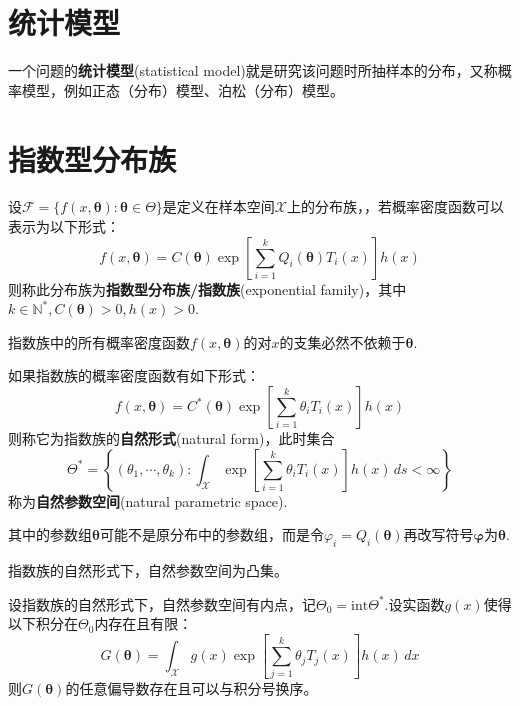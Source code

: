 \documentclass{ctexbook}
\begin{document}
\section{统计模型}

一个问题的\textbf{统计模型}(statistical model)就是研究该问题时所抽样本的分布，又称概率模型，例如正态（分布）模型、泊松（分布）模型。

\section{指数型分布族}

\begin{definition}
    设$\mathcal{F}=\{f(x,\boldsymbol{\theta}):\boldsymbol{\theta}\in\Theta\}$是定义在样本空间$\mathcal{X} $上的分布族，，若概率密度函数可以表示为以下形式：
    $$f(x,\boldsymbol{\theta})=C(\boldsymbol{\theta})\exp\left[\sum_{i=1}^k Q_i(\boldsymbol{\theta})T_i(x)\right]h(x)$$
    则称此分布族为\textbf{指数型分布族/指数族}(exponential family)，其中$k\in\mathbb{N}^*,C(\boldsymbol{\theta})>0,h(x)>0$.
\end{definition}

\begin{remark}
    指数族中的所有概率密度函数$f(x,\boldsymbol{\theta})$的对$x$的支集必然不依赖于$\boldsymbol{\theta}$.
\end{remark}

\begin{definition}
    如果指数族的概率密度函数有如下形式：
    $$f(x,\boldsymbol{\theta})=C^*(\boldsymbol{\theta})\exp\left[\sum_{i=1}^k\theta_i T_i(x)\right]h(x)$$
    则称它为指数族的\textbf{自然形式}(natural form)，此时集合
    $$\Theta^*=\left\{(\theta_1,\cdots,\theta_k):\int_{\mathcal{X}}\exp\left[\sum_{i=1}^k\theta_i T_i(x)\right]h(x)\,ds<\infty\right\}$$
    称为\textbf{自然参数空间}(natural parametric space).
\end{definition}

\begin{remark}
    其中的参数组$\boldsymbol{\theta}$可能不是原分布中的参数组，而是令$\varphi_i=Q_i(\boldsymbol{\theta})$再改写符号$\boldsymbol{\varphi}$为$\boldsymbol{\theta}$.
\end{remark}

\begin{theorem}
    指数族的自然形式下，自然参数空间为凸集。
\end{theorem}

\begin{theorem}
    设指数族的自然形式下，自然参数空间有内点，记$\Theta_0=\mathrm{int}\Theta^*$.设实函数$g(x)$使得以下积分在$\Theta_0$内存在且有限：
    $$G(\boldsymbol{\theta})=\int_{\mathcal{X} }g(x)\exp\left[\sum_{j=1}^k \theta_j T_j(x)\right]h(x)\,dx$$
    则$G(\boldsymbol{\theta})$的任意偏导数存在且可以与积分号换序。
\end{theorem}
\end{document}
